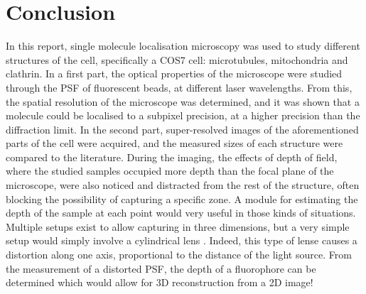 \section{Conclusion}
In this report, single molecule localisation microscopy was used to study different structures of the cell, specifically a COS7 cell: microtubules, mitochondria and clathrin. In a first part, the optical properties of the microscope were studied through the PSF of fluorescent beads, at different laser wavelengths. From this, the spatial resolution of the microscope was determined, and it was shown that a molecule could be localised to a subpixel precision, at a higher precision than the diffraction limit. In the second part, super-resolved images of the aforementioned parts of the cell were acquired, and the measured sizes of each structure were compared to the literature.
During the imaging, the effects of depth of field, where the studied samples occupied more depth than the focal plane of the microscope, were also noticed and distracted from the rest of the structure, often blocking the possibility of capturing a specific zone. A module for estimating the depth of the sample at each point would very useful in those kinds of situations. Multiple setups exist to allow capturing in three dimensions, but a very simple setup would simply involve a cylindrical lens \cite{jimenez_about_2020}. Indeed, this type of lense causes a distortion along one axis, proportional to the distance of the light source. From the measurement of a distorted PSF, the depth of a fluorophore can be determined which would allow for 3D reconstruction from a 2D image!